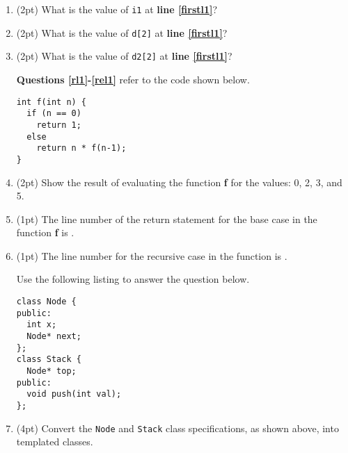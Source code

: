 \documentclass{article}
\newcommand*{\pts}[1]{\addtocounter{points}{#1}(#1pt)}
\begin{document}
\begin{spacing}{1.4}
\begin{enumerate}[leftmargin=*]
\item \pts{2} What is the value of \lstinline$i1$ at \textbf{line
  \ref{firstl1}}? \underline{\hspace{1in}}

\item \pts{2} What is the value of \lstinline$d[2]$ at \textbf{line
  \ref{firstl1}}? \underline{\hspace{1in}}

\item\label{el1} \pts{2} What is the value of \lstinline$d2[2]$ at \textbf{line
  \ref{firstl1}}? \underline{\hspace{1in}}

\newpage

\hspace{-.5cm}\textbf{Questions \ref{rl1}-\ref{rel1}} refer to the code shown below. 

\begin{lstlisting}[showspaces=false,showlines=true]
int f(int n) {
  if (n == 0)
    return 1;
  else
    return n * f(n-1);
}
\end{lstlisting}

\item\label{rl1} \pts{2} Show the result of evaluating the function
  \textbf{f} for the values: 0, 2, 3, and 5.

\vspace{4cm}

\item \pts{1} The line number of the return statement for the base
  case in the function \textbf{f} is \underline{\hspace{1in}}.

\item\label{rel1} \pts{1} The line number for the recursive case in
  the function is \underline{\hspace{1in}}.


\hspace{-.5cm}Use the following listing to answer the question below.

\begin{multicols}{2}
\begin{lstlisting}[numbers=none,frame=none]
class Node {
public:
  int x;
  Node* next;
};
class Stack {
  Node* top;
public:
  void push(int val);
};
\end{lstlisting}
\end{multicols}


\item \pts{4} Convert the \lstinline$Node$ and \lstinline$Stack$ class
  specifications, as shown above, into templated classes.



\end{enumerate}
\end{spacing}
\end{document}
